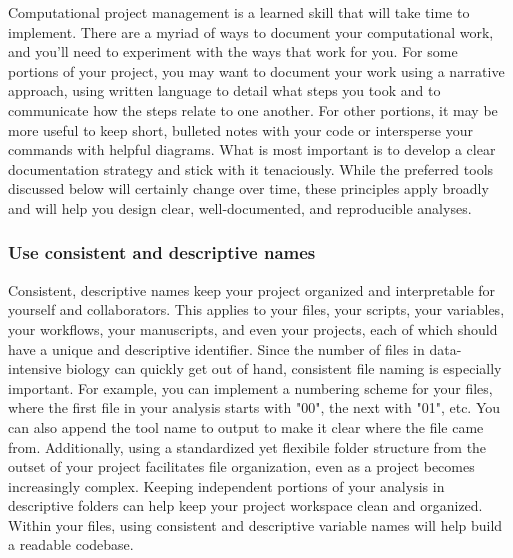\documentclass[10pt,letterpaper]{article}
\begin{document}
Computational project management is a learned skill that will take time to implement. There are a myriad of ways to document your computational work, and you'll need to experiment with the ways that work for you. 
For some portions of your project, you may want to document your work using a narrative approach, using written language to detail what steps you took and to communicate how the steps relate to one another. 
For other portions, it may be more useful to keep short, bulleted notes with your code or intersperse your commands with helpful diagrams. 
What is most important is to develop a clear documentation strategy and stick with it tenaciously. 
While the preferred tools discussed below will certainly change over time, these principles apply broadly and will help you design clear, well-documented, and reproducible analyses.

\subsubsection*{Use consistent and descriptive names}  
Consistent, descriptive names keep your project organized and interpretable for yourself and collaborators. 
This applies to your files, your scripts, your variables, your workflows, your manuscripts, and even your projects, each of which should have a unique and descriptive identifier. 
Since the number of files in data-intensive biology can quickly get out of hand, consistent file naming is especially important. 
For example, you can implement a numbering scheme for your files, where the first file in your analysis starts with "00", the next with "01", etc. 
You can also append the tool name to output to make it clear where the file came from. 
Additionally, using a standardized yet flexibile folder structure from the outset of your project facilitates file organization, even as a project becomes increasingly complex. 
Keeping independent portions of your analysis in descriptive folders can help keep your project workspace clean and organized.
Within your files, using consistent and descriptive variable names will help build a readable codebase.
\end{document}
